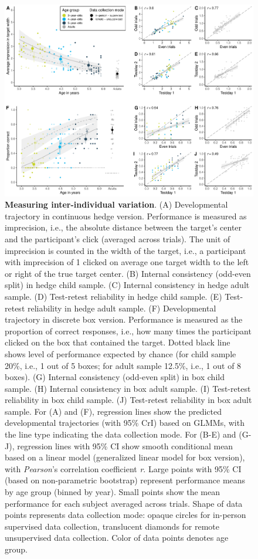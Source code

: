 \documentclass[
  man,floatsintext]{apa6}
\begin{document}
\begin{figure}

{\centering \includegraphics[width=1\linewidth]{../figures/tango_arrangedplot} 

}

\caption{\textbf{Measuring inter-individual variation}. (A) Developmental trajectory in continuous hedge version. Performance is measured as imprecision, i.e., the absolute distance between the target's center and the participant's click (averaged across trials). The unit of imprecision is counted in the width of the target, i.e., a participant with imprecision of 1 clicked on average one target width to the left or right of the true target center. (B) Internal consistency (odd-even split) in hedge child sample. (C) Internal consistency in hedge adult sample. (D) Test-retest reliability in hedge child sample. (E) Test-retest reliability in hedge adult sample. (F) Developmental trajectory in discrete box version. Performance is measured as the proportion of correct responses, i.e., how many times the participant clicked on the box that contained the target. Dotted black line shows level of performance expected by chance (for child sample 20\%, i.e., 1 out of 5 boxes; for adult sample 12.5\%, i.e., 1 out of 8 boxes). (G) Internal consistency (odd-even split) in box child sample. (H) Internal consistency in box adult sample. (I) Test-retest reliability in box child sample. (J) Test-retest reliability in box adult sample. For (A) and (F), regression lines show the predicted developmental trajectories (with 95\% CrI) based on GLMMs, with the line type indicating the data collection mode. For (B-E) and (G-J), regression lines with 95\% CI show smooth conditional mean based on a linear model (generalized linear model for box version), with \emph{Pearson}'s correlation coefficient \emph{r}. Large points with 95\% CI (based on non-parametric bootstrap) represent performance means by age group (binned by year). Small points show the mean performance for each subject averaged across trials. Shape of data points represents data collection mode: opaque circles for in-person supervised data collection, translucent diamonds for remote unsupervised data collection. Color of data points denotes age group.}\label{fig:fig2}
\end{figure}
\end{document}
